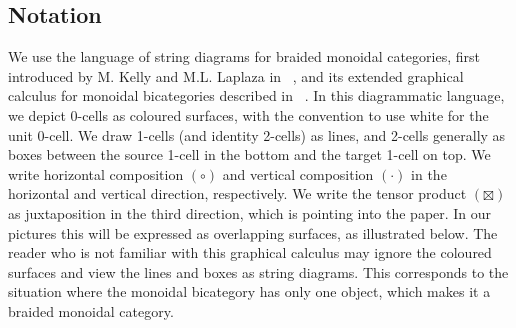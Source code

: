 \documentclass{amsart}
\newcommand{\tens}{\boxtimes}
\newcommand{\ver}{\cdot}
\newcommand{\hor}{\circ}
\begin{document}
\subsection{Notation}
We use the language of string diagrams for braided monoidal categories, first introduced by M. Kelly and M.L. Laplaza in ~\cite{kellylaplaza}, and its extended graphical calculus for monoidal bicategories described in ~\cite{bms}. In this diagrammatic language, we depict 0-cells as coloured surfaces, with the convention to use white for the unit 0-cell. We draw 1-cells (and identity 2-cells) as lines, and 2-cells generally as boxes between the source 1-cell in the bottom and the target 1-cell on top. We write horizontal composition $(\hor)$ and vertical composition $(\ver)$ in the horizontal and vertical direction, respectively. We write the tensor product $(\tens)$ as juxtaposition in the third direction, which is pointing into the paper. In our pictures this will be expressed as overlapping surfaces, as illustrated below. The reader who is not familiar with this graphical calculus may ignore the coloured surfaces and view the lines and boxes as string diagrams. This corresponds to the situation where the monoidal bicategory has only one object, which makes it a braided monoidal category. 
\end{document}
